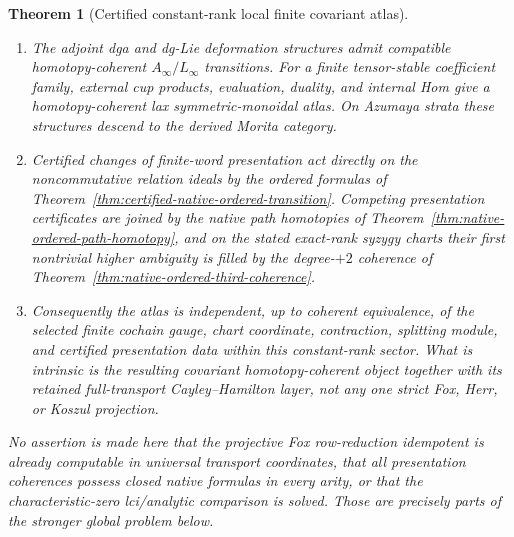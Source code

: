\documentclass[11pt]{article}
\newtheorem{theorem}{Theorem}[section]
\theoremstyle{definition}
\begin{document}
\begin{theorem}[Certified constant-rank local finite covariant atlas]
\begin{enumerate}[label=\textnormal{(\roman*)}]
\item The adjoint dga and dg-Lie deformation structures admit compatible
homotopy-coherent $A_\infty/L_\infty$ transitions.  For a finite tensor-stable
coefficient family, external cup products, evaluation, duality, and internal
Hom give a homotopy-coherent lax symmetric-monoidal atlas.  On Azumaya strata
these structures descend to the derived Morita category.

\item Certified changes of finite-word presentation act directly on the
noncommutative relation ideals by the ordered formulas of
Theorem~\ref{thm:certified-native-ordered-transition}.  Competing
presentation certificates are joined by the native path homotopies of
Theorem~\ref{thm:native-ordered-path-homotopy}, and on the stated exact-rank
syzygy charts their first nontrivial
higher ambiguity is filled by the degree-$+2$ coherence of
Theorem~\ref{thm:native-ordered-third-coherence}.

\item Consequently the atlas is independent, up to coherent equivalence, of
the selected finite cochain gauge, chart coordinate, contraction, splitting
module, and certified presentation data within this constant-rank sector.
What is intrinsic is the resulting covariant homotopy-coherent object together
with its retained full-transport Cayley--Hamilton layer, not any one strict
Fox, Herr, or Koszul projection.
\end{enumerate}
No assertion is made here that the projective Fox row-reduction idempotent is
already computable in universal transport coordinates, that all presentation
coherences possess closed native formulas in every arity, or that the
characteristic-zero lci/analytic comparison is solved.  Those are precisely
parts of the stronger global problem below.
\end{theorem}
\end{document}
